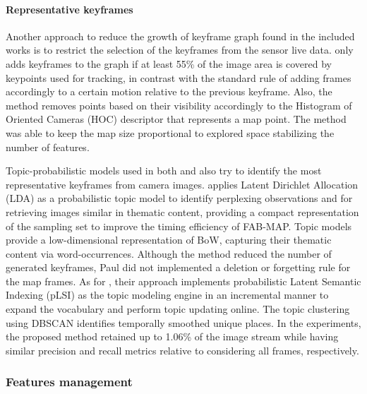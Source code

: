 \paragraph{Representative keyframes}

Another approach to reduce the growth of keyframe graph found in the included works is to restrict the selection of the keyframes from the sensor live data.
\cite{pirker-et-al:2011:6048253} only adds keyframes to the graph if at least 55\% of the image area is covered by keypoints used for tracking, in contrast with the standard rule of adding frames accordingly to a certain motion relative to the previous keyframe. Also, the method removes points based on their visibility accordingly to the Histogram of Oriented Cameras (HOC) descriptor that represents a map point. The method was able to keep the map size proportional to explored space stabilizing the number of features.

Topic-probabilistic models used in both \cite{paul-newman:2013:0278364913509859} and \cite{murphy-sibley:2014:6907022} also try to identify the most representative keyframes from camera images.
\cite{paul-newman:2013:0278364913509859} applies Latent Dirichlet Allocation (LDA) as a probabilistic topic model to identify perplexing observations and for retrieving images similar in thematic content, providing a compact representation of the sampling set to improve the timing efficiency of FAB-MAP. Topic models provide a low-dimensional representation of BoW, capturing their thematic content via word-occurrences. Although the method reduced the number of generated keyframes, Paul did not implemented a deletion or forgetting rule for the map frames.
As for \cite{murphy-sibley:2014:6907022}, their approach implements probabilistic Latent Semantic Indexing (pLSI) as the topic modeling engine in an incremental manner to expand the vocabulary and perform topic updating online. The topic clustering using DBSCAN identifies temporally smoothed unique places. In the experiments, the proposed method retained up to 1.06\% of the image stream while having similar precision and recall metrics relative to considering all frames, respectively.



\subsubsection{Features management}

